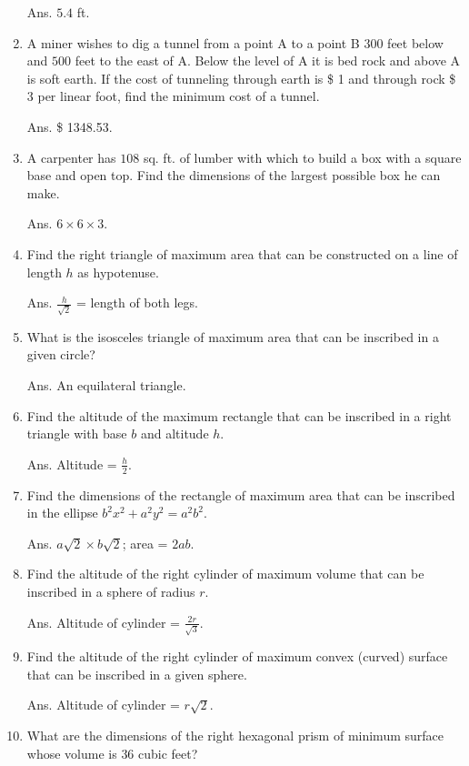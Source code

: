 \begin{enumerate}
Ans. $5.4$ ft.

\item
A miner wishes to dig a tunnel from a point A to a point B $300$ 
feet below and $500$ feet to the east of A. Below the level of A 
it is bed rock and above A is soft earth. If the cost of tunneling 
through earth is \$ 1 and through rock \$ 3 per linear foot, 
find the minimum cost of a tunnel.

Ans. \$ 1348.53.

\item
A carpenter has $108$ sq. ft. of lumber with which to build a box with 
a square base and open top. Find the dimensions of the largest 
possible box he can make.

Ans. $6 \times 6 \times 3$.

\item
Find the right triangle of maximum area that can be constructed on a 
line of length $h$ as hypotenuse.

Ans. $\frac{h}{\sqrt{2}}$ = length of both legs.

\item
What is the isosceles triangle of maximum area that can be inscribed 
in a given circle?

Ans. An equilateral triangle.

\item
Find the altitude of the maximum rectangle that can be inscribed 
in a right triangle with base $b$ and altitude $h$.

Ans. Altitude = $\frac{h}{2}$.

\item
Find the dimensions of the rectangle of maximum area that can be inscribed 
in the ellipse $b^2x^2 + a^2y^2 = a^2b^2$.

Ans. $a \sqrt{2}\times b \sqrt{2}$; area = $2ab$.

\item
Find the altitude of the right cylinder of maximum volume that 
can be inscribed in a sphere of radius $r$.

Ans. Altitude of cylinder = $\frac{2r}{\sqrt{3}}$.

\item
Find the altitude of the right cylinder of maximum convex (curved) 
surface that can be inscribed in a given sphere.

Ans. Altitude of cylinder = $r \sqrt{2}$.

\item
What are the dimensions of the right hexagonal prism of minimum 
surface whose volume is $36$ cubic feet?


\end{enumerate}

